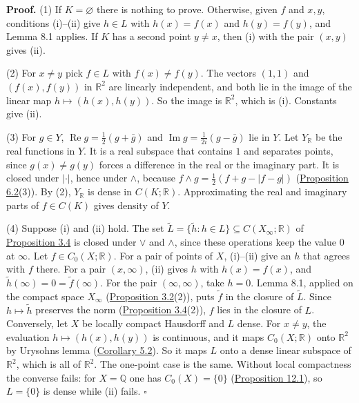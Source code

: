 \documentclass[
  english,
  11pt,
  a4paper,
]{article}
\begin{document}
\textbf{Proof.} (1) If \(K=\varnothing\) there is nothing to prove.
Otherwise, given \(f\) and \(x,y\), conditions (i)--(ii) give \(h\in L\)
with \(h(x)=f(x)\) and \(h(y)=f(y)\), and Lemma 8.1 applies. If \(K\)
has a second point \(y\neq x\), then (i) with the pair \((x,y)\) gives
(ii).

(2) For \(x\neq y\) pick \(f\in L\) with \(f(x)\neq f(y)\). The vectors
\((1,1)\) and \((f(x),f(y))\) in \(\mathbb R^2\) are linearly
independent, and both lie in the image of the linear map
\(h\mapsto(h(x),h(y))\). So the image is \(\mathbb R^2\), which is (i).
Constants give (ii).

(3) For \(g\in Y\), \(\operatorname{Re}g=\frac12(g+\bar g)\) and
\(\operatorname{Im}g=\frac1{2i}(g-\bar g)\) lie in \(Y\). Let
\(Y_{\mathbb R}\) be the real functions in \(Y\). It is a real subspace
that contains \(1\) and separates points, since \(g(x)\neq g(y)\) forces
a difference in the real or the imaginary part. It is closed under
\(|\cdot|\), hence under \(\wedge\), because
\(f\wedge g=\frac12(f+g-|f-g|)\)
(\hyperlink{the-stone-weierstrass-theorem-for-functions-vanishing-at-infinity--oa-fnd-sw-04}{Proposition
6.2}(3)). By (2), \(Y_{\mathbb R}\) is dense in \(C(K;\mathbb R)\).
Approximating the real and imaginary parts of \(f\in C(K)\) gives
density of \(Y\).

(4) Suppose (i) and (ii) hold. The set
\(\tilde L=\{\tilde h:h\in L\}\subseteq C(X_\infty;\mathbb R)\) of
\hyperlink{the-stone-weierstrass-theorem-for-functions-vanishing-at-infinity--oa-fnd-sw-03}{Proposition
3.4} is closed under \(\vee\) and \(\wedge\), since these operations
keep the value \(0\) at \(\infty\). Let \(f\in C_0(X;\mathbb R)\). For a
pair of points of \(X\), (i)--(ii) give an \(h\) that agrees with \(f\)
there. For a pair \((x,\infty)\), (ii) gives \(h\) with \(h(x)=f(x)\),
and \(\tilde h(\infty)=0=\tilde f(\infty)\). For the pair
\((\infty,\infty)\), take \(h=0\). Lemma 8.1, applied on the compact
space \(X_\infty\)
(\hyperlink{the-stone-weierstrass-theorem-for-functions-vanishing-at-infinity--oa-fnd-sw-02}{Proposition
3.2}(2)), puts \(\tilde f\) in the closure of \(\tilde L\). Since
\(h\mapsto\tilde h\) preserves the norm
(\hyperlink{the-stone-weierstrass-theorem-for-functions-vanishing-at-infinity--oa-fnd-sw-03}{Proposition
3.4}(2)), \(f\) lies in the closure of \(L\). Conversely, let \(X\) be
locally compact Hausdorff and \(L\) dense. For \(x\neq y\), the
evaluation \(h\mapsto(h(x),h(y))\) is continuous, and it maps
\(C_0(X;\mathbb R)\) onto \(\mathbb R^2\) by Urysohn\textquotesingle s
lemma
(\hyperlink{the-stone-weierstrass-theorem-for-functions-vanishing-at-infinity--oa-fnd-sw-16}{Corollary
5.2}). So it maps \(L\) onto a dense linear subspace of \(\mathbb R^2\),
which is all of \(\mathbb R^2\). The one-point case is the same. Without
local compactness the converse fails: for \(X=\mathbb Q\) one has
\(C_0(X)=\{0\}\)
(\hyperlink{the-stone-weierstrass-theorem-for-functions-vanishing-at-infinity--oa-fnd-sw-10}{Proposition
12.1}), so \(L=\{0\}\) is dense while (ii) fails. \(\square\)
\end{document}
